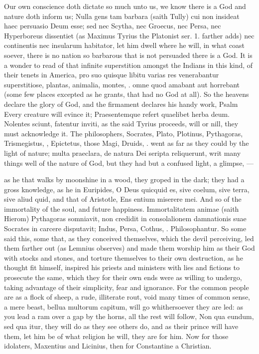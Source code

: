{Our own conscience doth dictate so much unto us, we know there is a God
and nature doth inform us; Nulla gens tam barbara (saith Tully) cui non
insideat haec persuasio Deum esse; sed nec Scytha, nec Groecus, nec
Persa, nec Hyperboreus dissentiet (as Maximus Tyrius the Platonist ser.
1. farther adds) nec continentis nec insularum habitator, let him dwell
where he will, in what coast soever, there is no nation so barbarous
that is not persuaded there is a God. It is a wonder to read of that
infinite superstition amongst the Indians in this kind, of their tenets
in America, pro suo quisque libitu varias res venerabantur
superstitiose, plantas, animalia, montes, \etc{}. omne quod amabant aut
horrebant (some few places excepted as he grants, that had no God at
all). So the heavens declare the glory of God, and the firmament
declares his handy work, Psalm  Every creature will evince it;
Praesentemque refert quaelibet herba deum. Nolentes sciunt, fatentur
inviti, as the said Tyrius proceeds, will or nill, they must
acknowledge it. The philosophers, Socrates, Plato, Plotinus,
Pythagoras, Trismegistus, \Seneca, Epictetus, those Magi, Druids, \etc{}.
went as far as they could by the light of nature; multa
praeclara, de natura Dei seripta reliquerunt, writ many things well of
the nature of God, but they had but a confused light, a glimpse,
---

as he that walks by moonshine in a wood, they groped in the dark; they
had a gross knowledge, as he in Euripides, O Deus quicquid es, sive
coelum, sive terra, sive aliud quid, and that of Aristotle, Ens entium
miserere mei. And so of the immortality of the soul, and future
happiness. Immortalitatem animae (saith Hierom) Pythagoras somniavit,
\Democritus{} non credidit in consolalionem damnationis suae Socrates in
carcere disputavit; Indus, Persa, Cothus, \etc{}. Philosophantur. So some
said this, some that, as they conceived themselves, which the devil
perceiving, led them farther out (as Lemnius observes) and made
them worship him as their God with stocks and stones, and torture
themselves to their own destruction, as he thought fit himself,
inspired his priests and ministers with lies and fictions to prosecute
the same, which they for their own ends were as willing to undergo,
taking advantage of their simplicity, fear and ignorance. For the
common people are as a flock of sheep, a rude, illiterate rout, void
many times of common sense, a mere beast, bellua multorum capitum, will
go whithersoever they are led: as you lead a ram over a gap by the
horns, all the rest will follow, Non qua eundum, sed qua itur,
they will do as they see others do, and as their prince will have them,
let him be of what religion he will, they are for him. Now for those
idolaters, Maxentius and Licinius, then for Constantine a Christian.

}

